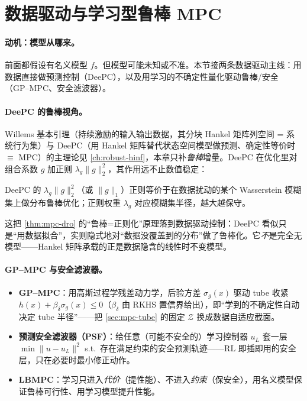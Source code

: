 \section{数据驱动与学习型鲁棒 MPC}
\label{sec:mpc-learning}

\paragraph{动机：模型从哪来。}
前面都假设有名义模型 $f$。但模型可能未知或不准。本节接两条数据驱动主线：用数据直接做预测控制（DeePC），以及用学习的不确定性量化驱动鲁棒/安全（GP--MPC、安全滤波器）。

\paragraph{DeePC 的鲁棒视角。}
Willems 基本引理（持续激励的输入输出数据，其分块 Hankel 矩阵列空间 = 系统行为集）与 DeePC（用 Hankel 矩阵替代状态空间模型做预测、确定性等价时 $\equiv$ MPC）的主理论见 \cref{ch:robust-hinf}，本章只补\emph{鲁棒}增量。DeePC 在优化里对组合系数 $g$ 加正则 $\lambda_g\|g\|_2^2$，其作用远不止数值稳定：

\begin{theorem}
\label{thm:mpc-deepc-dro}
DeePC 的 $\lambda_g\|g\|_2^2$（或 $\|g\|_1$）正则等价于在数据扰动的某个 Wasserstein 模糊集上做分布鲁棒优化；正则权重 $\lambda_g$ 对应模糊集半径，越大越保守。
\end{theorem}

\noindent{}这把 \cref{thm:mpc-dro} 的“鲁棒=正则化”原理落到数据驱动控制：DeePC 看似只是“用数据拟合”，实则隐式地对“数据没覆盖到的分布”做了鲁棒化。它\emph{不}是完全无模型——Hankel 矩阵承载的正是数据隐含的线性时不变模型。

\paragraph{GP--MPC 与安全滤波器。}
\begin{itemize}
  \item \textbf{GP--MPC}\cite{koller2018gpmpc}：用高斯过程学残差动力学，后验方差 $\sigma_g(x)$ 驱动 tube 收紧 $h(x)+\beta_\delta\sigma_g(x)\le0$（$\beta_\delta$ 由 RKHS 置信界给出），即“学到的不确定性自动决定 tube 半径”——把 \cref{sec:mpc-tube} 的固定 $\mathcal Z$ 换成数据自适应截面。
  \item \textbf{预测安全滤波器（PSF）}\cite{wabersich2021psf}：给任意（可能不安全的）学习控制器 $u_L$ 套一层 $\min\|u-u_L\|^2$ s.t.\ 存在满足约束的安全预测轨迹——RL 即插即用的安全层，只在必要时最小修正动作。
  \item \textbf{LBMPC}\cite{aswani2013lbmpc}：学习只进入\emph{代价}（提性能）、不进入\emph{约束}（保安全），用名义模型保证鲁棒可行性、用学习模型提升性能。
\end{itemize}

